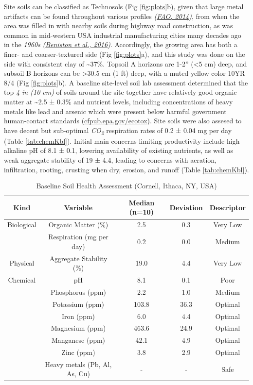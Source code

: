 \documentclass[
  12pt,
]{article}
\begin{document}
Site soils can be classified as Technosols (Fig \ref{fig:plots}b), given that large metal artifacts can be found throughout various profiles \emph{(\protect\hyperlink{ref-fao14}{FAO, 2014})}, from when the area was filled in with nearby soils during highway road construction, as was common in mid-western USA industrial manufacturing cities many decades ago in the \emph{1960s} \emph{(\protect\hyperlink{ref-beniston16}{Beniston et al., 2016})}.
Accordingly, the growing area has both a finer- and coarser-textured side (Fig \ref{fig:plots}a),
and this study was done on the side with consistent clay of \textasciitilde37\%.
Topsoil A horizons are 1-2'' (\textless5 cm) deep, and subsoil B horizons can be \textgreater30.5 cm (1 ft) deep, with a muted yellow color 10YR 8/4 (Fig \ref{fig:plots}b).
A baseline site-level soil lab assessment determined that the top \emph{4 in (10 cm)} of soils around the site together have relatively good organic matter at
\textasciitilde2.5 ±
0.3\%
and nutrient levels, including concentrations of heavy metals like lead and arsenic which were present below harmful government human-contact standards (\url{cfpub.epa.gov/ecotox}).
Site soils were also assesed to have decent but sub-optimal \emph{CO\textsubscript{2}} respiration rates of
0.2 ±
0.04 mg per day
(Table \ref{tab:chemKbl}).
Initial main concerns limiting productivity include high alkaline pH of
8.1 ±
0.1,
lowering availability of existing nutrients, as well as weak aggregate stability of
19 ±
4.4,
leading to concerns with aeration, infiltration, rooting, crusting when dry, erosion, and runoff (Table \ref{tab:chemKbl}).

\begin{table}

\caption{\label{tab:chem}Baseline Soil Health Assessment (Cornell, Ithaca, NY, USA)}
\centering
\begin{tabular}[t]{c|c|c|c|c}
\hline
\textbf{Kind} & \textbf{Variable} & \textbf{Median (n=10)} & \textbf{Deviation} & \textbf{Descriptor}\\
\hline
Biological & Organic Matter (\%) & 2.5 & 0.3 & Very Low\\
\hline
 & Respiration (mg per day) & 0.2 & 0.0 & Medium\\
\hline
Physical & Aggregate Stability (\%) & 19.0 & 4.4 & Very Low\\
\hline
Chemical & pH & 8.1 & 0.1 & Poor\\
\hline
 & Phosphorus (ppm) & 2.2 & 1.0 & Medium\\
\hline
 & Potassium (ppm) & 103.8 & 36.3 & Optimal\\
\hline
 & Iron (ppm) & 6.0 & 4.4 & Optimal\\
\hline
 & Magnesium (ppm) & 463.6 & 24.9 & Optimal\\
\hline
 & Manganese (ppm) & 42.1 & 4.9 & Optimal\\
\hline
 & Zinc (ppm) & 3.8 & 2.9 & Optimal\\
\hline
 & Heavy metals (Pb, Al, As, Cu) & - & - & Safe\\
\hline
\end{tabular}
\end{table}
\end{document}

